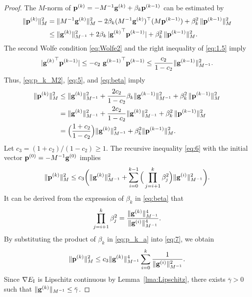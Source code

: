 \documentclass[11pt,a4paper]{article}
\begin{document}
\begin{proof}
The $M$-norm of $\mathbf{p}^{(k)} = -M^{-1} \mathbf{g}^{(k)} + \beta_k \mathbf{p}^{(k-1)}$ can be estimated by
\begin{align}
\| \mathbf{p}^{(k)} \|^2_{M}
&=  \| M^{-1} \mathbf{g}^{(k)} \|_{M}^2 - 2 \beta_k (M^{-1} \mathbf{g}^{(k)} )^\top (M \mathbf{p}^{(k-1)}) + \beta^2_k \, \|\mathbf{p}^{(k-1)}\|_{M}^2 \nonumber\\
& \leq \| \mathbf{g}^{(k)} \|^2_{M^{-1}} + 2\beta_k \, |{\mathbf{g}^{(k)}}^{\top} \mathbf{p}^{(k-1)} | + \beta^2_k \, \|\mathbf{p}^{(k-1)}\|_{M}^2. \label{eq:p_k_M2}
\end{align}
The second Wolfe condition \eqref{eq:Wolfe2} and the right inequality of \eqref{eq:1.5} imply
\begin{equation}
| {\mathbf{g}^{(k)}}^{\top} \mathbf{p}^{(k-1)} | \leq -c_2 ~{\mathbf{g}^{(k-1)}}^{\top} \mathbf{p}^{(k-1)} \leq \frac{c_2}{1-c_2} \| {\mathbf{g}^{(k-1)}} \|^2_{M^{-1}}.  \label{eq:5}
\end{equation}
Thus, \eqref{eq:p_k_M2}, \eqref{eq:5}, and \eqref{eq:beta} imply
\begin{align}
\| \mathbf{p}^{(k)} \|^2_{M}
&\leq \| {\mathbf{g}^{(k)}} \|^2_{M^{-1}} + \frac{2c_2}{1-c_2} \beta_k  \| {\mathbf{g}^{(k-1)}} \|^2_{M^{-1}} + \beta^2_k \, \|\mathbf{p}^{(k-1)}\|_{M}^2 \nonumber\\
&= \| {\mathbf{g}^{(k)}} \|^2_{M^{-1}} + \frac{2c_2}{1-c_2} \| {\mathbf{g}^{(k)}}\|^2_{M^{-1}}  + \beta^2_k \, \|\mathbf{p}^{(k-1)}\|_{M}^2 \nonumber\\
&= \Big (\frac{1+c_2}{1-c_2} \Big ) \| \mathbf{g}^{(k)} \|^2_{M^{-1}} + \beta^2_k \|\mathbf{p}^{(k-1)}\|_{M}^2. \label{eq:6}
\end{align}
Let $c_3 = (1+c_2) / (1-c_2) \geq 1$. 
The recursive inequality \eqref{eq:6} with the initial vector $\mathbf{p}^{(0)} = -M^{-1} {\mathbf{g}^{(0)}}$ implies
\begin{equation} \label{eq:p_k_a}
\| \mathbf{p}^{(k)} \|^2_{M} \leq c_3 \bigg( \|\mathbf{g}^{(k)}\|^2_{M^{-1}} + \sum_{i=0}^{k-1} \Big(\prod_{j=i+1}^k \beta_j^2\Big) \|{\mathbf{g}^{(i)}}\|_{M^{-1}}^2 \bigg).
\end{equation}
It can be derived from the expression of $\beta_k$ in \eqref{eq:beta} that
\begin{equation} \label{eq:7}
\prod_{j=i+1}^k \beta_j^2 = \frac{\| {\mathbf{g}^{(k)}} \|^4_{M^{-1}}}{\| {\mathbf{g}^{(i)}} \|^4_{M^{-1}}}.  
\end{equation}
By substituting the product of $\beta_k$ in \eqref{eq:p_k_a} into \eqref{eq:7}, we obtain
\begin{equation} \label{eq:4.31}
\| \mathbf{p}^{(k)} \|^2_{M} \leq c_3 \| \mathbf{g}^{(k)} \|^4_{M^{-1}} \sum_{i=0}^{k} \frac{1}{\| \mathbf{g}^{(i)} \|^2_{M^{-1}}}.
\end{equation}
Since $\nabla E_{\mathrm{I}}$ is Lipschitz continuous by Lemma~\ref{lma:Lipschitz}, there exists $\overline{\gamma} > 0$ such that $\|\mathbf{g}^{(k)}\|_{M^{-1}} \leq \bar{\gamma}$.

\end{proof}
\end{document}
